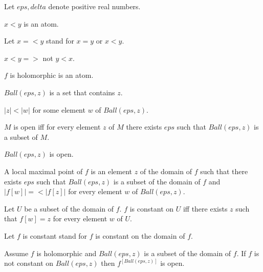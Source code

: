 \documentclass{document}
\begin{document}
\begin{forthel}
    Let $eps, delta$ denote positive real numbers.

    \begin{signature}
      $x < y$ is an atom.
    \end{signature}

    Let $x =< y$ stand for $x = y$ or $x < y$.

    \begin{axiom}
      $x < y =>$ not $y < x$.
    \end{axiom}

    \begin{signature}
      $f$ is holomorphic is an atom.
    \end{signature}

    \begin{signature}
      $Ball(eps,z)$ is a set that contains $z$.
    \end{signature}

    \begin{axiom}
      $|z| < |w|$ for some element $w$ of $Ball(eps,z)$.
    \end{axiom}

    \begin{definition}
      $M$ is open iff for every element $z$ of $M$ there exists $eps$ such that $Ball(eps,z)$ is a subset of $M$.
    \end{definition}

    \begin{axiom}
      $Ball(eps,z)$ is open.
    \end{axiom}

    \begin{definition}
      A local maximal point of $f$ is an element $z$ of the domain of $f$ such that there exists $eps$ such that $Ball(eps,z)$ is a subset of the domain of $f$ and $|f[w]| =< |f[z]|$ for every element $w$ of $Ball(eps,z)$.
    \end{definition}

    \begin{definition}
      Let $U$ be a subset of the domain of $f$. $f$ is constant on $U$ iff there exists $z$ such that $f[w] = z$ for every element $w$ of $U$.
    \end{definition}

    Let $f$ is constant stand for $f$ is constant on the domain of $f$.

    \begin{axiom}
      Assume $f$ is holomorphic and $Ball(eps,z)$ is a subset of the domain of $f$. If $f$ is not constant on $Ball(eps,z)$ then $f^[Ball(eps,z)]$ is open.
    \end{axiom}


\end{forthel}
\end{document}
